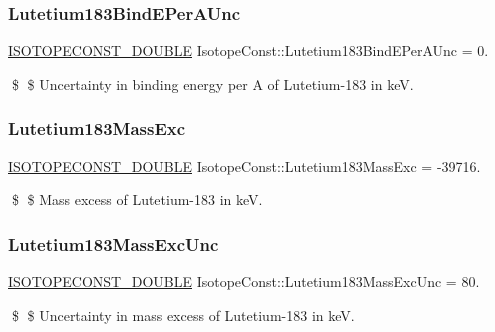 \subsubsection{\texorpdfstring{Lutetium183\+Bind\+E\+Per\+A\+Unc}{Lutetium183BindEPerAUnc}}
{\footnotesize\ttfamily \mbox{\hyperlink{group___isotope_const-_macros_ga8f45a7272ce02c0b4c65c44636ed719a}{I\+S\+O\+T\+O\+P\+E\+C\+O\+N\+S\+T\+\_\+\+D\+O\+U\+B\+LE}} Isotope\+Const\+::\+Lutetium183\+Bind\+E\+Per\+A\+Unc = 0.}

\$ \$ Uncertainty in binding energy per A of Lutetium-\/183 in keV. \mbox{\label{group___isotope_const-_lutetium-_lu183_ga87609ac1c98b9c4ddd1c41a6630e0af7}} 
\subsubsection{\texorpdfstring{Lutetium183\+Mass\+Exc}{Lutetium183MassExc}}
{\footnotesize\ttfamily \mbox{\hyperlink{group___isotope_const-_macros_ga8f45a7272ce02c0b4c65c44636ed719a}{I\+S\+O\+T\+O\+P\+E\+C\+O\+N\+S\+T\+\_\+\+D\+O\+U\+B\+LE}} Isotope\+Const\+::\+Lutetium183\+Mass\+Exc = -\/39716.}

\$ \$ Mass excess of Lutetium-\/183 in keV. \mbox{\label{group___isotope_const-_lutetium-_lu183_ga97b757340d2786ac5b61b4fcb23a61ce}} 
\subsubsection{\texorpdfstring{Lutetium183\+Mass\+Exc\+Unc}{Lutetium183MassExcUnc}}
{\footnotesize\ttfamily \mbox{\hyperlink{group___isotope_const-_macros_ga8f45a7272ce02c0b4c65c44636ed719a}{I\+S\+O\+T\+O\+P\+E\+C\+O\+N\+S\+T\+\_\+\+D\+O\+U\+B\+LE}} Isotope\+Const\+::\+Lutetium183\+Mass\+Exc\+Unc = 80.}

\$ \$ Uncertainty in mass excess of Lutetium-\/183 in keV. \mbox{\label{group___isotope_const-_lutetium-_lu183_ga111186c93ad9552845571054079dabd2}} 
